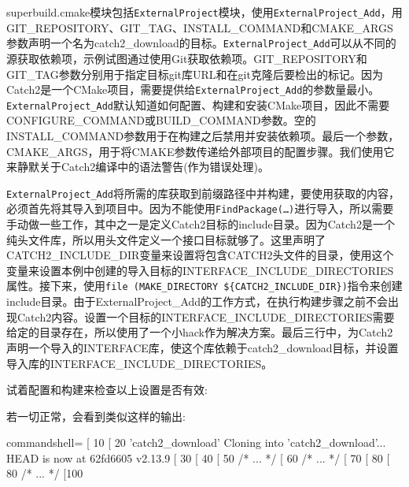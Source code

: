 superbuild.cmake模块包括\texttt{ExternalProject}模块，使用\texttt{ExternalProject\_Add}，用GIT\_REPOSITORY、GIT\_TAG、INSTALL\_COMMAND和CMAKE\_ARGS参数声明一个名为catch2\_download的目标。\texttt{ExternalProject\_Add}可以从不同的源获取依赖项，示例试图通过使用Git获取依赖项。GIT\_REPOSITORY和GIT\_TAG参数分别用于指定目标git库URL和在git克隆后要检出的标记。因为Catch2是一个CMake项目，需要提供给\texttt{ExternalProject\_Add}的参数量最小。\texttt{ExternalProject\_Add}默认知道如何配置、构建和安装CMake项目，因此不需要CONFIGURE\_COMMAND或BUILD\_COMMAND参数。空的INSTALL\_COMMAND参数用于在构建之后禁用并安装依赖项。最后一个参数，CMAKE\_ARGS，用于将CMAKE参数传递给外部项目的配置步骤。我们使用它来静默关于Catch2编译中的语法警告(作为错误处理)。

\texttt{ExternalProject\_Add}将所需的库获取到前缀路径中并构建，要使用获取的内容，必须首先将其导入到项目中。因为不能使用\texttt{FindPackage(…)}进行导入，所以需要手动做一些工作，其中之一是定义Catch2目标的include目录。因为Catch2是一个纯头文件库，所以用头文件定义一个接口目标就够了。这里声明了CATCH2\_INCLUDE\_DIR变量来设置将包含CATCH2头文件的目录，使用这个变量来设置本例中创建的导入目标的INTERFACE\_INCLUDE\_DIRECTORIES属性。接下来，使用\texttt{file (MAKE\_DIRECTORY \$\{CATCH2\_INCLUDE\_DIR\})}指令来创建include目录。由于ExternalProject\_Add的工作方式，在执行构建步骤之前不会出现Catch2内容。设置一个目标的INTERFACE\_INCLUDE\_DIRECTORIES需要给定的目录存在，所以使用了一个小hack作为解决方案。最后三行中，为Catch2声明一个导入的INTERFACE库，使这个库依赖于catch2\_download目标，并设置导入库的INTERFACE\_INCLUDE\_DIRECTORIES。

试着配置和构建来检查以上设置是否有效:


若一切正常，会看到类似这样的输出:

\begin{tcblisting}{commandshell={}}
[ 10%
[ 20%
  'catch2_download'
Cloning into 'catch2_download'...
HEAD is now at 62fd6605 v2.13.9
[ 30%
[ 40%
[ 50%
/* ... */
[ 60%
/* ... */
[ 70%
[ 80%
[ 80%
/* ... */
[100%
\end{tcblisting}


